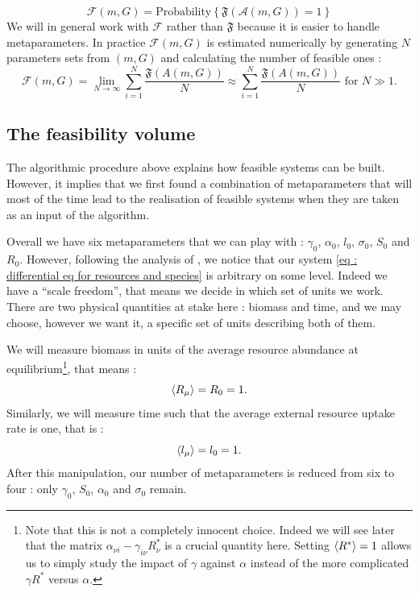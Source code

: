 \documentclass[12pt, titlepage]{report}
\begin{document}
\begin{equation}\boxed{
\mathcal{F}(m, G)=\text{Probability}\left\{\mathfrak{F}\left(\mathcal{A}(m, G)\right)=1\right\}
}
\end{equation}
We will in general work with $\mathcal{F}$ rather than $\mathfrak{F}$ because it is easier to handle metaparameters. In practice $\mathcal{F}(m, G)$ is estimated numerically by generating $N$ parameters sets from $(m,G)$ and calculating the number of feasible ones :
\begin{equation}
\mathcal{F}(m, G) = \lim_{N\rightarrow \infty} \sum_{i=1}^N \frac{\mathfrak{F}(A(m,G))}{N} \approx \sum_{i=1}^N \frac{\mathfrak{F}(A(m,G))}{N} \text{ for } N \gg 1.
\end{equation}

\subsection{The feasibility volume}
The algorithmic procedure above explains how feasible systems can be built. However, it implies that we first found a combination of metaparameters that will most of the time lead to the realisation of feasible systems when they are taken as an input of the algorithm.

Overall we have six metaparameters that we can play with : $\gamma_0$, $\alpha_0$, $l_0$, $\sigma_0$, $S_0$ and $R_0$. However, following the analysis of \cite{barbier_cavity_2017}, we notice that our system \eqref{eq : differential eq for resources and species} is arbitrary on some level. Indeed we have a ``scale freedom'', that means we decide in which set of units we work. There are two physical quantities at stake here : biomass and time, and we may choose, however we want it, a specific set of units describing both of them.

We will measure biomass in units of the average resource abundance at equilibrium\footnote{Note that this is not a completely innocent choice. Indeed we will see later that the matrix $\alpha_{\nu i}-\gamma_{i \nu} R^*_\nu$ is a crucial quantity here. Setting $\langle R^* \rangle=1$ allows us to simply study the impact of $\gamma$ against $\alpha$ instead of the more complicated $\gamma R^*$ versus $\alpha$.}, that means :
\begin{equation}
 \langle R_\mu \rangle = R_0 = 1.
\end{equation}
Similarly, we will measure time such that the average external resource uptake rate is one, that is :
\begin{equation}
\langle l_\mu \rangle = l_0 = 1.
\end{equation}
After this manipulation, our number of metaparameters is reduced from six to four : only $\gamma_0$, $S_0$, $\alpha_0$ and $\sigma_0$ remain.
\end{document}
